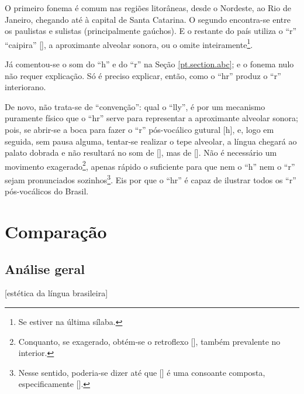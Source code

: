 \documentclass[12pt, a5paper, titlepage]{article}
\begin{document}
O primeiro fonema é comum nas regiões litorâneas, desde o Nordeste, ao Rio de Janeiro, chegando até à capital de Santa Catarina. O segundo encontra-se entre os paulistas e sulistas (principalmente gaúchos). E o restante do país utiliza o ``r'' ``caipira'' [\textturnr], a aproximante alveolar sonora, ou o omite inteiramente\footnote{
    Se estiver na última sílaba.
}.

Já comentou-se o som do ``h'' e do ``r'' na Seção \ref{pt.section.abc}; e o fonema nulo não requer explicação. Só é preciso explicar, então, como o ``hr'' produz o ``r'' interiorano.

De novo, não trata-se de ``convenção'': qual o ``lly'', é por um mecanismo puramente físico que o ``hr'' serve para representar a aproximante alveolar sonora; pois, se abrir-se a boca para fazer o ``r'' pós-vocálico gutural [h], e, logo em seguida, sem pausa alguma, tentar-se realizar o tepe alveolar, a língua chegará ao palato dobrada e não resultará no som de [\textfishhookr], mas de [\textturnr]. Não é necessário um movimento exagerado\footnote{
    Conquanto, se exagerado, obtém-se o retroflexo [\textturnrrtail], também prevalente no interior. 
}, apenas rápido o suficiente para que nem o ``h'' nem o ``r'' sejam pronunciados sozinhos\footnote{
    Nesse sentido, poderia-se dizer até que [\textturnr] é uma consoante composta, especificamente [].
}. Eis por que o ``hr'' é capaz de ilustrar todos os ``r'' pós-vocálicos do Brasil.

\section{Comparação}
\subsection{Análise geral}
[estética da língua brasileira]
\end{document}
